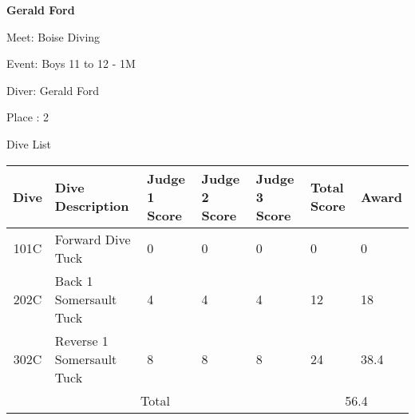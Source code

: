 \documentclass[12pt, letterpaper, landscape]{article}
\begin{document}
	\begin{center}
		\textbf{Gerald Ford}
	\end{center}
	
	Meet: Boise Diving

	Event: Boys 11 to 12 - 1M
	
	Diver: Gerald Ford
	
	Place : 2
	
	\begin{center}
		Dive List
	\end{center}
	
	\begin{table}[h]
		\centering
			\begin{tabularx}{\textwidth}{|c X X X X X X|}
			Dive&Dive Description&Judge 1 Score&Judge 2 Score&Judge 3 Score&Total Score & Award\\\midrule
			101C&Forward Dive Tuck&0&0&0&0&0\\\midrule
202C&Back 1 Somersault Tuck&4&4&4&12&18\\\midrule
302C&Reverse 1 Somersault Tuck&8&8&8&24&38.4\\\midrule
\midrule
			\multicolumn{5}{|c}{Total} & \multicolumn{2}{c|}{56.4}\\
		\end{tabularx}
	\end{table}
\end{document}
